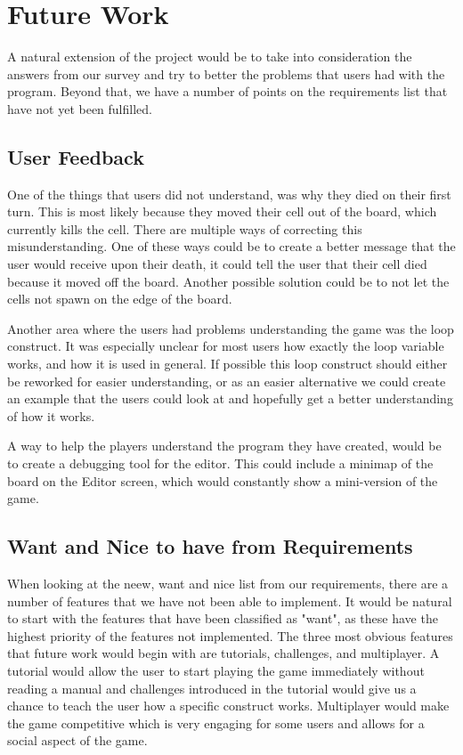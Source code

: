 \section{Future Work}
\label{sec:future_work}
A natural extension of the project would be to take into consideration the answers from our survey and try to better the problems that users had with the program. Beyond that, we have a number of points on the requirements list that have not yet been fulfilled.

\subsection{User Feedback}
One of the things that users did not understand, was why they died on their first turn. This is most likely because they moved their cell out of the board, which currently kills the cell. There are multiple ways of correcting this misunderstanding. One of these ways could be to create a better message that the user would receive upon their death, it could tell the user that their cell died because it moved off the board. Another possible solution could be to not let the cells not spawn on the edge of the board.\newline

Another area where the users had problems understanding the game was the loop construct. It was especially unclear for most users how exactly the loop variable works, and how it is used in general. If possible this loop construct should either be reworked for easier understanding, or as an easier alternative we could create an example that the users could look at and hopefully get a better understanding of how it works. \newline


A way to help the players understand the program they have created, would be to create a debugging tool for the editor. This could include a minimap of the board on the Editor screen, which would constantly show a mini-version of the game. 

\subsection{Want and Nice to have from Requirements}
When looking at the neew, want and nice list from our requirements, there are a number of features that we have not been able to implement. It would be natural to start with the features that have been classified as "want", as these have the highest priority of the features not implemented. The three most obvious features that future work would begin with are tutorials, challenges, and multiplayer. A tutorial would allow the user to start playing the game immediately without reading a manual and challenges introduced in the tutorial would give us a chance to teach the user how a specific construct works. Multiplayer would make the game competitive which is very engaging for some users and allows for a social aspect of the game.

